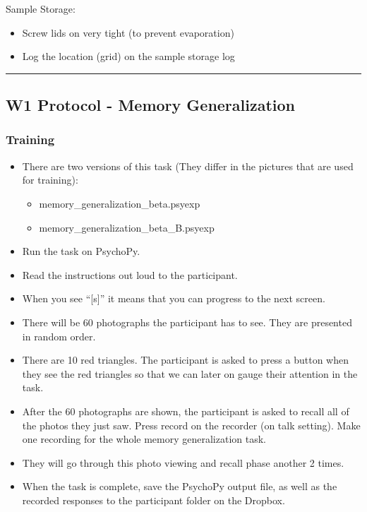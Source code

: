 \documentclass[
]{book}
\providecommand{\tightlist}{%
  \setlength{\itemsep}{0pt}\setlength{\parskip}{0pt}}
\begin{document}
Sample Storage:

\begin{itemize}
\tightlist
\item
  Screw lids on very tight (to prevent evaporation)
\item
  Log the location (grid) on the sample storage log
\end{itemize}

\begin{center}\rule{0.5\linewidth}{0.5pt}\end{center}

\hypertarget{w1-protocol---memory-generalization}{%
\subsection{W1 Protocol - Memory Generalization}\label{w1-protocol---memory-generalization}}

\hypertarget{training}{%
\subsubsection{Training}\label{training}}

\begin{itemize}
\tightlist
\item
  There are two versions of this task (They differ in the pictures that are used for training):

  \begin{itemize}
  \tightlist
  \item
    memory\_generalization\_beta.psyexp
  \item
    memory\_generalization\_beta\_B.psyexp
  \end{itemize}
\item
  Run the task on PsychoPy.
\item
  Read the instructions out loud to the participant.
\item
  When you see ``{[}s{]}'' it means that you can progress to the next screen.
\item
  There will be 60 photographs the participant has to see. They are presented in random order.
\item
  There are 10 red triangles. The participant is asked to press a button when they see the red triangles so that we can later on gauge their attention in the task.
\item
  After the 60 photographs are shown, the participant is asked to recall all of the photos they just saw. Press record on the recorder (on talk setting). Make one recording for the whole memory generalization task.
\item
  They will go through this photo viewing and recall phase another 2 times.
\item
  When the task is complete, save the PsychoPy output file, as well as the recorded responses to the participant folder on the Dropbox.
\end{itemize}
\end{document}
